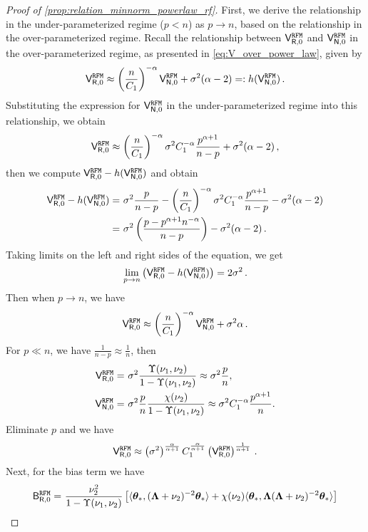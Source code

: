 \begin{proof}[Proof of \cref{prop:relation_minnorm_powerlaw_rf}]
First, we derive the relationship in the under-parameterized regime ($p < n$) as $p \to n$, based on the relationship in the over-parameterized regime.
Recall the relationship between $\mathsf V_{\mathsf R,0}^{\tt RFM}$ and $\mathsf V_{\mathsf N,0}^{\tt RFM}$ in the over-parameterized regime, as presented in \cref{eq:V_over_power_law}, given by 
\[
\mathsf V_{\mathsf R,0}^{\tt RFM} \approx \left(\frac{n}{C_1}\right)^{-\alpha} \mathsf V_{\mathsf N,0}^{\tt RFM} + \sigma^2 (\alpha-2) =:h(\mathsf V_{\mathsf N,0}^{\tt RFM})\,.
\]
Substituting the expression for $\mathsf V_{\mathsf N,0}^{\tt RFM}$ in the under-parameterized regime into this relationship, we obtain
\[
\mathsf V_{\mathsf R,0}^{\tt RFM} \approx \left(\frac{n}{C_1}\right)^{-\alpha} \sigma^2 C_1^{-\alpha} \frac{p^{\alpha+1}}{n-p} + \sigma^2 (\alpha-2)\,,
\]
then we compute $\mathsf V_{\mathsf R,0}^{\tt RFM} - h(\mathsf V_{\mathsf N,0}^{\tt RFM})$ and obtain
\[
\begin{aligned}
    \mathsf V_{\mathsf R,0}^{\tt RFM} - h(\mathsf V_{\mathsf N,0}^{\tt RFM}) =&~ \sigma^2 \frac{p}{n-p} - \left(\frac{n}{C_1}\right)^{-\alpha} \sigma^2 C_1^{-\alpha} \frac{p^{\alpha+1}}{n-p} - \sigma^2 (\alpha-2)\\
    =&~ \sigma^2\left(\frac{p-p^{\alpha+1}n^{-\alpha}}{n-p}\right) - \sigma^2 (\alpha-2)\,.
\end{aligned}
\]
Taking limits on the left and right sides of the equation, we get
\[
\lim_{p \to n} \left(\mathsf V_{\mathsf R,0}^{\tt RFM} - h(\mathsf V_{\mathsf N,0}^{\tt RFM})\right) = 2\sigma^2\,.
\]
Then when $p \to n$, we have
\begin{equation}\label{eq:V_under_power_law}
    \mathsf V_{\mathsf R,0}^{\tt RFM} \approx \left(\frac{n}{C_1}\right)^{-\alpha} \mathsf V_{\mathsf N,0}^{\tt RFM} + \sigma^2 \alpha\,.
\end{equation}
For $p \ll n$, we have $\frac{1}{n-p} \approx \frac{1}{n}$, then 
\[
\begin{aligned}
\mathsf V_{\mathsf R,0}^{\tt RFM} =&~ \sigma^2 \frac{\Upsilon(\nu_1, \nu_2)}{1 - \Upsilon(\nu_1, \nu_2)} \approx \sigma^2 \frac{p}{n},\\
\mathsf V_{\mathsf N,0}^{\tt RFM} =&~ \sigma^2 \frac{p}{n} \frac{\chi(\nu_2)}{1 - \Upsilon(\nu_1, \nu_2)} \approx \sigma^2 C_1^{-\alpha} \frac{p^{\alpha+1}}{n}.
\end{aligned}
\]
Eliminate $p$ and we have
\[
\mathsf V_{\mathsf R,0}^{\tt RFM} \approx \left(\sigma^2\right)^{\frac{\alpha}{\alpha+1}} C_1^{\frac{\alpha}{\alpha+1}} \left(\mathsf V_{\mathsf R,0}^{\tt RFM}\right)^\frac{1}{\alpha+1}\,.
\]
Next, for the bias term we have
\[
\begin{aligned}
\sB_{\sR,0}^{\tt RFM} =&~ \frac{\nu_2^2}{1 - \Upsilon(\nu_1, \nu_2)} \left[ \< \btheta_*, (\bLambda + \nu_2)^{-2} \btheta_* \> + \chi(\nu_2) \< \btheta_*, \bLambda (\bLambda + \nu_2)^{-2} \btheta_* \> \right]\\

\end{aligned}\]
\end{proof}
